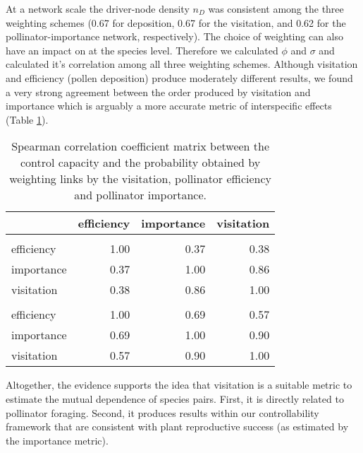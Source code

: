 \documentclass[a4paper]{artikel1}
\theoremstyle{definition}
\theoremstyle{definition}
\theoremstyle{definition}
\theoremstyle{remark}
\begin{document}
At a network scale the driver-node density \(n_D\) was consistent among
the three weighting schemes (0.67 for deposition, 0.67 for the
visitation, and 0.62 for the pollinator-importance network,
respectively). The choice of weighting can also have an impact on at the
species level. Therefore we calculated \(\phi\) and \(\sigma\) and
calculated it's correlation among all three weighting schemes. Although
visitation and efficiency (pollen deposition) produce moderately
different results, we found a very strong agreement between the order
produced by visitation and importance which is arguably a more accurate
metric of interspecific effects (Table
\ref{tab:tab-assumption-visitation}).

\begin{table}[!h]

\caption{\label{tab:tab-assumption-visitation}Spearman correlation coefficient matrix between the control capacity and the probability obtained by weighting links by the visitation, pollinator efficiency and pollinator importance.}
\centering
\fontsize{8}{10}\selectfont
\begin{tabular}[t]{lrrr}
\toprule
 & efficiency & importance & visitation\\
\midrule
\addlinespace[0.3em]
\multicolumn{4}{l}{\textbf{control capacity}}\\
\hspace{1em}efficiency & 1.00 & 0.37 & 0.38\\
\hspace{1em}importance & 0.37 & 1.00 & 0.86\\
\hspace{1em}visitation & 0.38 & 0.86 & 1.00\\
\addlinespace[0.3em]
\multicolumn{4}{l}{\textbf{superior probability}}\\
\hspace{1em}efficiency & 1.00 & 0.69 & 0.57\\
\hspace{1em}importance & 0.69 & 1.00 & 0.90\\
\hspace{1em}visitation & 0.57 & 0.90 & 1.00\\
\bottomrule
\end{tabular}
\end{table}

Altogether, the evidence supports the idea that visitation is a suitable
metric to estimate the mutual dependence of species pairs. First, it is
directly related to pollinator foraging. Second, it produces results
within our controllability framework that are consistent with plant
reproductive success (as estimated by the importance metric).
\end{document}
